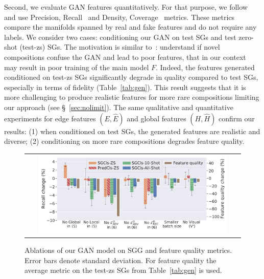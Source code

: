 Second, we evaluate GAN features quantitatively. For that purpose, we follow~\citep{devries2020instance} and use Precision, Recall~\citep{kynkaanniemi2019improved} and Density, Coverage~\citep{naeem2020reliable} metrics. 
These metrics compare the manifolds spanned by real and fake features and do not require any labels.
We consider two cases: conditioning our GAN on test SGs and test zero-shot (test-zs) SGs. The motivation is similar to~\citep{casanova2020generating}: understand if novel compositions confuse the GAN and lead to poor features, that in our context may result in poor training of the main model $F$. 
Indeed, the features generated conditioned on test-zs SGs significantly degrade in quality compared to test SGs, especially in terms of fidelity (Table~\ref{tab:gen}). This result suggests that it is more challenging to produce realistic features for more rare compositions limiting our approach (see \S~\ref{sec:nolimit}).
The same qualitative and quantitative experiments for edge features $(E,\hat{E})$ and global features $(H,\hat{H})$ confirm our results: (1) when conditioned on test SGs, the generated features are realistic and diverse; (2) conditioning on more rare compositions degrades feature quality.%




\begin{figure}[t]
\centering
\setlength{\tabcolsep}{0pt}
\vspace{-2pt}
\begin{tabular}{c}
\includegraphics[width=0.9\textwidth]{ablations.pdf} 
\end{tabular}
\vspace{-10pt}
\caption{
	\small Ablations of our GAN model on SGG and feature quality metrics. Error bars denote standard deviation. For feature quality the average metric on the test-zs SGs from Table~\ref{tab:gen} is used.}
\label{fig:ablations}
\end{figure}

